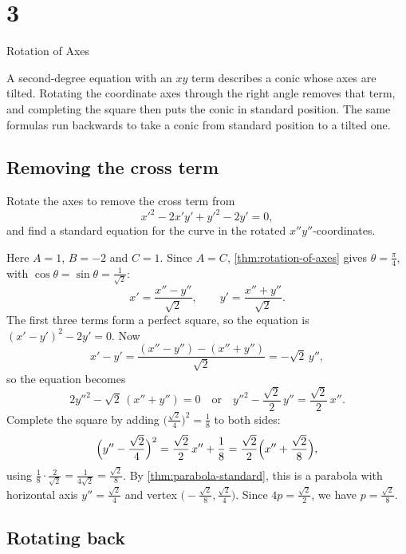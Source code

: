 \chapter{3}{Rotation of Axes}

A second-degree equation with an $xy$ term describes a conic whose axes are
tilted. Rotating the coordinate axes through the right angle removes that
term, and completing the square then puts the conic in standard position.
The same formulas run backwards to take a conic from standard position to
a tilted one.

\section{Removing the cross term}\label{sec:rotation}



\begin{exercise}\label{ex:rotate-parabola}
  Rotate the axes to remove the cross term from
  \[
    x'^2 - 2x'y' + y'^2 - 2y' = 0,
  \]
  and find a standard equation for the curve in the rotated
  $x''y''$-coordinates.
\end{exercise}

\begin{solution}
  Here $A = 1$, $B = -2$ and $C = 1$. Since $A = C$,
  \cref{thm:rotation-of-axes} gives $\theta = \frac{\pi}{4}$, with
  $\cos\theta = \sin\theta = \frac{1}{\sqrt2}$:
  \[
    x' = \frac{x'' - y''}{\sqrt2}, \qquad y' = \frac{x'' + y''}{\sqrt2}.
  \]
  The first three terms form a perfect square, so the equation is
  $(x' - y')^2 - 2y' = 0$. Now
  \[
    x' - y' = \frac{(x'' - y'') - (x'' + y'')}{\sqrt2} = -\sqrt2\, y'',
  \]
  so the equation becomes
  \[
    2y''^2 - \sqrt2\,(x'' + y'') = 0
    \quad\text{or}\quad
    y''^2 - \frac{\sqrt2}{2}\,y'' = \frac{\sqrt2}{2}\,x''.
  \]
  Complete the square by adding
  $\bigl(\frac{\sqrt2}{4}\bigr)^2 = \frac18$ to both sides:
  \[
    \Bigl(y'' - \frac{\sqrt2}{4}\Bigr)^2
    = \frac{\sqrt2}{2}\,x'' + \frac18
    = \frac{\sqrt2}{2}\Bigl(x'' + \frac{\sqrt2}{8}\Bigr),
  \]
  using $\frac18 \cdot \frac{2}{\sqrt2} = \frac{1}{4\sqrt2} = \frac{\sqrt2}{8}$.
  By \cref{thm:parabola-standard}, this is a parabola with horizontal axis
  $y'' = \frac{\sqrt2}{4}$ and vertex
  $\bigl(-\frac{\sqrt2}{8}, \frac{\sqrt2}{4}\bigr)$. Since
  $4p = \frac{\sqrt2}{2}$, we have $p = \frac{\sqrt2}{8}$. \qedhere
\end{solution}

\section{Rotating back}\label{sec:rotating-back}

